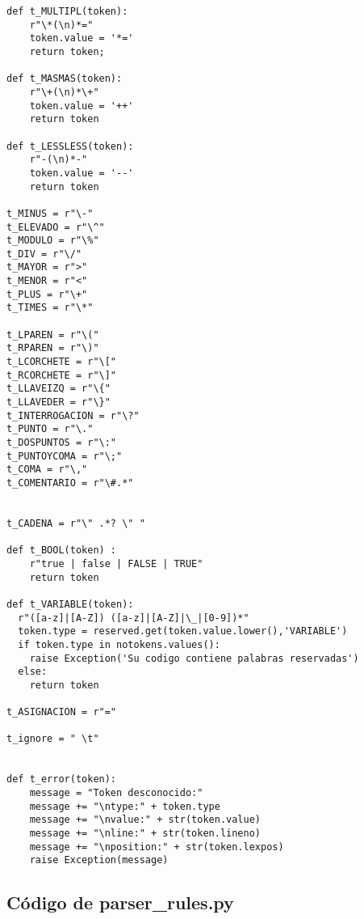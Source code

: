 \begin{verbatim}
def t_MULTIPL(token):
    r"\*(\n)*="
    token.value = '*='
    return token;

def t_MASMAS(token):
    r"\+(\n)*\+"
    token.value = '++'
    return token

def t_LESSLESS(token):
    r"-(\n)*-"
    token.value = '--'
    return token

t_MINUS = r"\-"
t_ELEVADO = r"\^"
t_MODULO = r"\%"
t_DIV = r"\/"
t_MAYOR = r">"
t_MENOR = r"<"
t_PLUS = r"\+"
t_TIMES = r"\*"

t_LPAREN = r"\("
t_RPAREN = r"\)"
t_LCORCHETE = r"\["
t_RCORCHETE = r"\]"
t_LLAVEIZQ = r"\{"
t_LLAVEDER = r"\}"
t_INTERROGACION = r"\?"
t_PUNTO = r"\."
t_DOSPUNTOS = r"\:"
t_PUNTOYCOMA = r"\;"
t_COMA = r"\,"
t_COMENTARIO = r"\#.*"


t_CADENA = r"\" .*? \" "

def t_BOOL(token) : 
    r"true | false | FALSE | TRUE"
    return token

def t_VARIABLE(token):
  r"([a-z]|[A-Z]) ([a-z]|[A-Z]|\_|[0-9])*"
  token.type = reserved.get(token.value.lower(),'VARIABLE')
  if token.type in notokens.values():
  	raise Exception('Su codigo contiene palabras reservadas')
  else:	
	return token

t_ASIGNACION = r"="

t_ignore = " \t"


def t_error(token):
    message = "Token desconocido:"
    message += "\ntype:" + token.type
    message += "\nvalue:" + str(token.value)
    message += "\nline:" + str(token.lineno)
    message += "\nposition:" + str(token.lexpos)
    raise Exception(message)

\end{verbatim}

\subsection{Código de parser\_rules.py }

